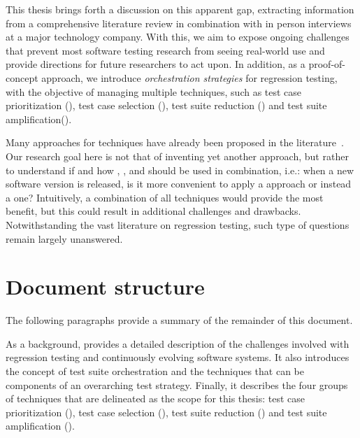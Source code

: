 
This thesis brings forth a discussion on this apparent gap, extracting information from a comprehensive literature review in combination with in person interviews at a major technology company.
With this, we aim to expose ongoing challenges that prevent most software testing research from seeing real-world use and provide directions for future researchers to act upon.
In addition, as a proof-of-concept approach, we introduce \textit{orchestration strategies} for regression testing, with the objective of managing multiple \rt techniques, such as test case prioritization (\tcp), test case selection (\tcs), test suite reduction (\tsr) and test suite amplification(\tsa).

Many approaches for \rt techniques have already been proposed in the literature~\cite{soetens2016change,legunsen2016,henard2016,luo2018static}.
Our research goal here is not that of inventing yet another approach, but rather to understand if and how \tcs, \tcp, \tsr and \tsa should be used in combination, i.e.:
when a new software version is released, is it more convenient to apply a \tcs approach or instead a \tcp one?
Intuitively, a combination of all techniques would provide the most benefit, but this could result in additional challenges and drawbacks.
Notwithstanding the vast literature on regression testing, such type of questions remain largely unanswered.

\section{Document structure}

The following paragraphs provide a summary of the remainder of this document.

As a background,  provides a detailed description of the challenges involved with regression testing and continuously evolving software systems.
It also introduces the concept of test suite orchestration and the techniques that can be components of an overarching test strategy.
Finally, it describes the four groups of techniques that are delineated as the scope for this thesis: test case prioritization (\tcp), test case selection (\tcs), test suite reduction (\tsr) and test suite amplification (\tsa).

